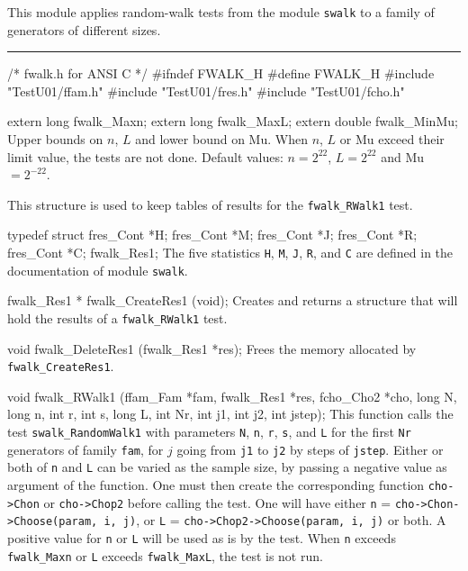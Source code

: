 
This module applies random-walk tests from the module {\tt swalk}
to a family of generators of different sizes.

\bigskip
\hrule
\code\hide
/* fwalk.h  for ANSI C */
#ifndef FWALK_H
#define FWALK_H
\endhide
#include "TestU01/ffam.h"
#include "TestU01/fres.h"
#include "TestU01/fcho.h"


extern long fwalk_Maxn;
extern long fwalk_MaxL;
extern double fwalk_MinMu;
\endcode
\tab
  Upper bounds on $n$, $L$ and lower bound on Mu.
  When $n$, $L$ or Mu exceed their limit value, the tests are not done.
  Default values: $n = 2^{22}$, $L = 2^{22}$ and Mu ${} = 2^{-22}$.
\endtab


\ifdetailed  %


This structure is used to keep tables of results for the
 {\tt fwalk\_RWalk1} test.
\code

typedef struct {
   fres_Cont *H;
   fres_Cont *M;
   fres_Cont *J;
   fres_Cont *R;
   fres_Cont *C;
} fwalk_Res1;
\endcode
 \tab The five statistics {\tt H}, {\tt M}, {\tt J}, {\tt R}, and {\tt C}
  are defined in the documentation of module {\tt swalk}.
 \endtab
\code


fwalk_Res1 * fwalk_CreateRes1 (void);
\endcode
 \tab 
  Creates and returns a structure that will hold the results
  of a {\tt fwalk\_RWalk1} test. 
 \endtab
\code


void fwalk_DeleteRes1 (fwalk_Res1 *res);
\endcode
 \tab 
  Frees the memory allocated by {\tt fwalk\_CreateRes1}.
 \endtab

\fi %


\code

void fwalk_RWalk1 (ffam_Fam *fam, fwalk_Res1 *res, fcho_Cho2 *cho,
                   long N, long n, int r, int s, long L,
                   int Nr, int j1, int j2, int jstep);
\endcode
\tab This function calls the test {\tt swalk\_RandomWalk1} with
  parameters {\tt N}, {\tt n},  {\tt r},  {\tt s}, and {\tt L} for the
  first {\tt Nr} generators of family {\tt fam}, for $j$ going from
  {\tt j1} to {\tt j2} by steps of {\tt jstep}. Either or both of  {\tt n}
  and {\tt L} can be varied as the sample size, by passing a negative value as
  argument of the function. One must then create the corresponding function
  {\tt cho->Chon} or {\tt cho->Chop2} before calling the test.
  One will have either {\tt n} = {\tt cho->Chon->Choose(param, i, j)},
  or {\tt L} = {\tt cho->Chop2->Choose(param, i, j)} or both. A positive
  value for {\tt n} or {\tt L} will be used as is by the test. When {\tt n}
  exceeds {\tt fwalk\_Maxn} or {\tt L} exceeds {\tt fwalk\_MaxL}, 
  the test is not run.
\endtab
\code


